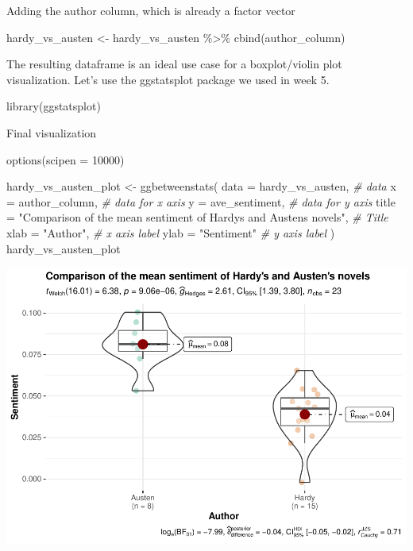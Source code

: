 \documentclass[
]{article}
\newenvironment{Shaded}{\begin{snugshade}}{\end{snugshade}}
\newcommand{\AttributeTok}[1]{\textcolor[rgb]{0.77,0.63,0.00}{#1}}
\newcommand{\CommentTok}[1]{\textcolor[rgb]{0.56,0.35,0.01}{\textit{#1}}}
\newcommand{\DecValTok}[1]{\textcolor[rgb]{0.00,0.00,0.81}{#1}}
\newcommand{\FunctionTok}[1]{\textcolor[rgb]{0.00,0.00,0.00}{#1}}
\newcommand{\NormalTok}[1]{#1}
\newcommand{\OtherTok}[1]{\textcolor[rgb]{0.56,0.35,0.01}{#1}}
\newcommand{\SpecialCharTok}[1]{\textcolor[rgb]{0.00,0.00,0.00}{#1}}
\newcommand{\StringTok}[1]{\textcolor[rgb]{0.31,0.60,0.02}{#1}}
\begin{document}
Adding the author column, which is already a factor vector

\begin{Shaded}
\begin{Highlighting}[]
\NormalTok{hardy\_vs\_austen }\OtherTok{\textless{}{-}}\NormalTok{ hardy\_vs\_austen }\SpecialCharTok{\%\textgreater{}\%} 
  \FunctionTok{cbind}\NormalTok{(author\_column)}
\end{Highlighting}
\end{Shaded}

The resulting dataframe is an ideal use case for a boxplot/violin plot
visualization. Let's use the ggstatsplot package we used in week 5.

\begin{Shaded}
\begin{Highlighting}[]
\FunctionTok{library}\NormalTok{(ggstatsplot)}
\end{Highlighting}
\end{Shaded}

Final visualization

\begin{Shaded}
\begin{Highlighting}[]
\FunctionTok{options}\NormalTok{(}\AttributeTok{scipen =} \DecValTok{10000}\NormalTok{)}

\NormalTok{hardy\_vs\_austen\_plot }\OtherTok{\textless{}{-}} \FunctionTok{ggbetweenstats}\NormalTok{( }
  \AttributeTok{data =}\NormalTok{ hardy\_vs\_austen, }\CommentTok{\# data}
  \AttributeTok{x =}\NormalTok{ author\_column, }\CommentTok{\# data for x axis}
  \AttributeTok{y =}\NormalTok{ ave\_sentiment, }\CommentTok{\# data for y axis}
  \AttributeTok{title =} \StringTok{"Comparison of the mean sentiment of Hardy\textquotesingle{}s and Austen\textquotesingle{}s novels"}\NormalTok{, }\CommentTok{\# Title}
  \AttributeTok{xlab =} \StringTok{"Author"}\NormalTok{, }\CommentTok{\# x axis label}
  \AttributeTok{ylab =} \StringTok{"Sentiment"} \CommentTok{\# y axis label}
\NormalTok{)}
\NormalTok{hardy\_vs\_austen\_plot}
\end{Highlighting}
\end{Shaded}

\includegraphics{Week8_files/figure-latex/unnamed-chunk-21-1.pdf}
\end{document}
